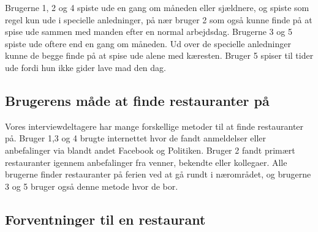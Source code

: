 \documentclass[a4paper, 12pt]{article}
\begin{document}
Brugerne 1, 2 og 4 spiste ude en gang om måneden eller sjældnere, og spiste som regel
kun ude i specielle anledninger, på nær bruger 2 som også kunne finde på at spise ude
sammen med manden efter en normal arbejdsdag.
Brugerne 3 og 5 spiste ude oftere end en gang om måneden. Ud over de specielle anledninger
kunne de begge finde på at spise ude alene med kæresten. Bruger 5 spiser til tider ude
fordi hun ikke gider lave mad den dag.



\subsection{Brugerens måde at finde restauranter på}

Vores interviewdeltagere har mange forskellige metoder til at finde restauranter på.
Bruger 1,3 og 4 brugte internettet hvor de fandt anmeldelser eller anbefalinger via
blandt andet Facebook og Politiken. Bruger 2 fandt primært restauranter igennem
anbefalinger fra venner, bekendte eller kollegaer. Alle brugerne finder restauranter
på ferien ved at gå rundt i nærområdet, og brugerne 3 og 5 bruger også denne
metode hvor de bor.


\subsection{Forventninger til en restaurant}
\end{document}

